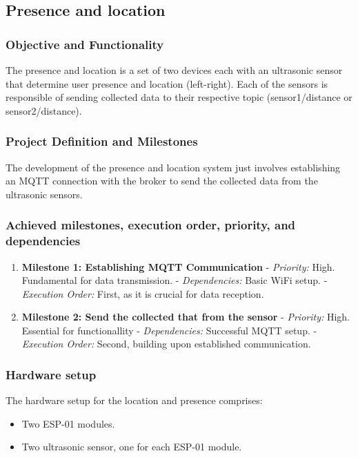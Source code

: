 \subsection{Presence and location}

\subsubsection{Objective and Functionality}
The presence and location is a set of two devices each with an ultrasonic sensor that determine user presence and location (left-right). Each of the sensors is responsible of sending collected data to their respective topic (sensor1/distance or sensor2/distance).

\subsubsection{Project Definition and Milestones}
The development of the presence and location system just involves establishing an MQTT connection with the broker to send the collected data from the ultrasonic sensors.

\subsubsection{Achieved milestones, execution order, priority, and dependencies}
\begin{enumerate}
    \item \textbf{Milestone 1: Establishing MQTT Communication}
       - \textit{Priority:} High. Fundamental for data transmission.
       - \textit{Dependencies:} Basic WiFi setup.
       - \textit{Execution Order:} First, as it is crucial for data reception.

    \item \textbf{Milestone 2: Send the collected that from the sensor}
       - \textit{Priority:} High. Essential for functionallity
       - \textit{Dependencies:} Successful MQTT setup.
       - \textit{Execution Order:} Second, building upon established communication.
\end{enumerate}

\subsubsection{Hardware setup}
The hardware setup for the location and presence comprises:
\begin{itemize}
    \item Two ESP-01 modules.
    \item Two ultrasonic sensor, one for each ESP-01 module.
\end{itemize}


